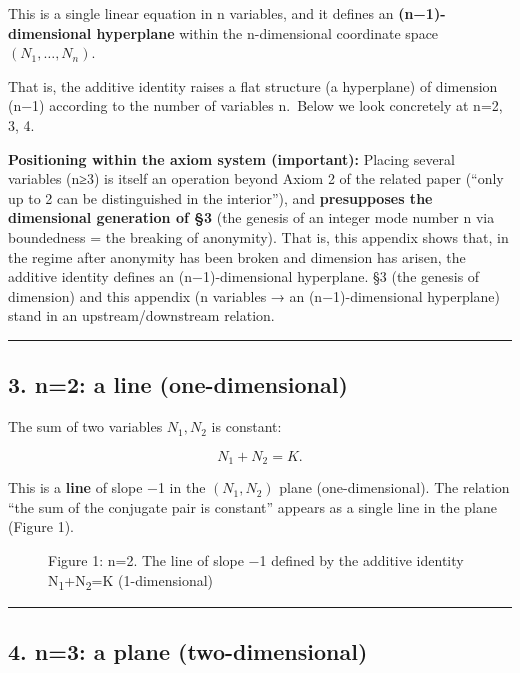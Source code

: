 \documentclass[11pt]{ltjsarticle}
\providecommand{\pandocbounded}[1]{#1}
\begin{document}
This is a single linear equation in n variables, and it defines an
\textbf{(n−1)-dimensional hyperplane} within the n-dimensional
coordinate space \((N_1,\dots,N_n)\).

That is, the additive identity raises a flat structure (a hyperplane) of
dimension (n−1) according to the number of variables n.~Below we look
concretely at n=2, 3, 4.

\textbf{Positioning within the axiom system (important):} Placing
several variables (n≥3) is itself an operation beyond Axiom 2 of the
related paper (``only up to 2 can be distinguished in the interior''),
and \textbf{presupposes the dimensional generation of §3} (the genesis
of an integer mode number n via boundedness = the breaking of
anonymity). That is, this appendix shows that, in the regime after
anonymity has been broken and dimension has arisen, the additive
identity defines an (n−1)-dimensional hyperplane. §3 (the genesis of
dimension) and this appendix (n variables → an (n−1)-dimensional
hyperplane) stand in an upstream/downstream relation.

\begin{center}\rule{0.5\linewidth}{0.5pt}\end{center}

\subsection{3. n=2: a line
(one-dimensional)}\label{n2-a-line-one-dimensional}

The sum of two variables \(N_1, N_2\) is constant:

\[N_1 + N_2 = K .\]

This is a \textbf{line} of slope −1 in the \((N_1, N_2)\) plane
(one-dimensional). The relation ``the sum of the conjugate pair is
constant'' appears as a single line in the plane (Figure 1).

\begin{figure}
\centering
\pandocbounded{}
\caption{Figure 1: n=2. The line of slope −1 defined by the additive
identity N\textsubscript{1}+N\textsubscript{2}=K (1-dimensional)}
\end{figure}

\begin{center}\rule{0.5\linewidth}{0.5pt}\end{center}

\subsection{4. n=3: a plane
(two-dimensional)}\label{n3-a-plane-two-dimensional}
\end{document}
